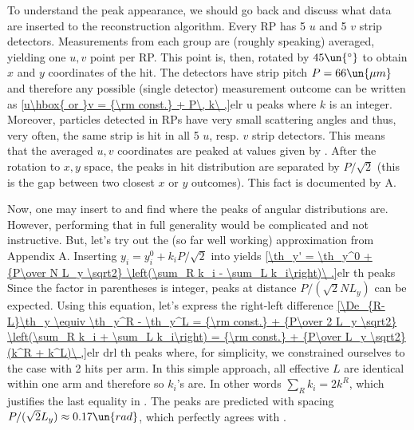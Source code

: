 To understand the peak appearance, we should go back and discuss what data are inserted to the reconstruction algorithm. Every RP has 5 $u$ and 5 $v$ strip detectors. Measurements from each group are (roughly speaking) averaged, yielding one $u, v$ point per RP. This point is, then, rotated by $45\un{^\circ}$ to obtain $x$ and $y$ coordinates of the hit. The detectors have strip pitch $P = 66\un{\mu m}$ and therefore any possible (single detector) measurement outcome can be written as
\eqref{u\hbox{ or }v = {\rm const.} + P\, k\ ,}{elr u peaks}
where $k$ is an integer. Moreover, particles detected in RPs have very small scattering angles and thus, very often, the same strip is hit in all 5 $u$, resp. $v$ strip detectors. This means that the averaged $u, v$ coordinates are peaked at values given by . After the rotation to $x, y$ space, the peaks in hit distribution are separated by $P/\sqrt{2}$ (this is the gap between two closest $x$ or $y$ outcomes). This fact is documented by A.

Now, one may insert  to  and find where the peaks of angular distributions are. However, performing that in full generality would be complicated and not instructive. But, let's try out the (so far well working) approximation from Appendix A. Inserting $y_i = y^0_i + k_i P / \sqrt2$ into  yields
\eqref{\th_y' = \th_y^0 + {P\over N L_y \sqrt2} \left(\sum_R k_i - \sum_L k_i\right)\ .}{elr th peaks}
Since the factor in parentheses is integer, peaks at distance $P/(\sqrt2 N L_y)$ can be expected. Using this equation, let's express the right-left difference
\eqref{\De_{R-L}\th_y \equiv \th_y^R - \th_y^L =  {\rm const.} + {P\over 2 L_y \sqrt2} \left(\sum_R k_i + \sum_L k_i\right) = {\rm const.} + {P\over L_y \sqrt2} (k^R + k^L)\ ,}{elr drl th peaks}
where, for simplicity, we constrained ourselves to the case with 2 hits per arm. In this simple approach, all effective $L$ are identical within one arm and therefore so $k_i$'s are. In other words $\sum_R k_i = 2 k^R$, which justifies the last equality in . The peaks are predicted with spacing $P/(\sqrt2 L_y)\approx 0.17\un{rad}$, which perfectly agrees with .

\emfig

